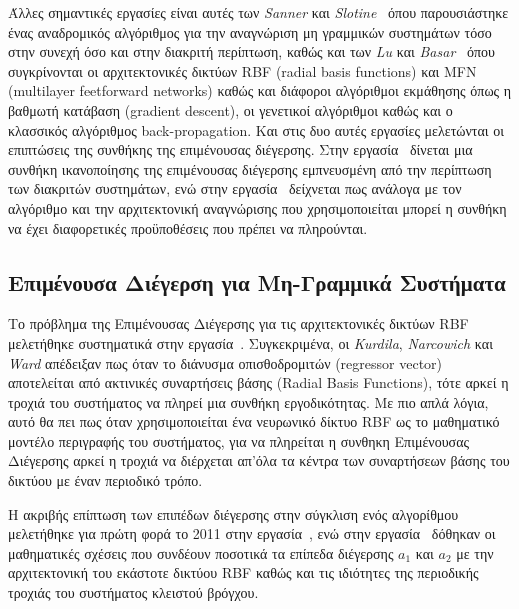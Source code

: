 Άλλες σημαντικές εργασίες είναι αυτές των \textit{Sanner} και \textit{Slotine}~\cite{sanner1992stable} όπου παρουσιάστηκε ένας αναδρομικός αλγόριθμος για την αναγνώριση μη γραμμικών συστημάτων τόσο στην συνεχή όσο και στην διακριτή περίπτωση, καθώς και των \textit{Lu} και \textit{Basar}~\cite{lu1998robust} όπου συγκρίνονται οι αρχιτεκτονικές δικτύων RBF (radial basis functions) και MFN (multilayer feetforward networks) καθώς και διάφοροι αλγόριθμοι εκμάθησης όπως η βαθμωτή κατάβαση (gradient descent), οι γενετικοί αλγόριθμοι καθώς και ο κλασσικός αλγόριθμος back-propagation. Και στις δυο αυτές εργασίες μελετώνται οι επιπτώσεις της συνθήκης της επιμένουσας διέγερσης. Στην εργασία~\cite{sanner1992stable} δίνεται μια συνθήκη ικανοποίησης της επιμένουσας διέγερσης εμπνευσμένη από την περίπτωση των διακριτών συστημάτων, ενώ στην εργασία~\cite{lu1998robust} δείχνεται πως ανάλογα με τον αλγόριθμο και την αρχιτεκτονική αναγνώρισης που χρησιμοποιείται μπορεί η συνθήκη να έχει διαφορετικές προϋποθέσεις που πρέπει να πληρούνται.

\subsection{Επιμένουσα Διέγερση για Μη-Γραμμικά Συστήματα}
Το πρόβλημα της Επιμένουσας Διέγερσης για τις αρχιτεκτονικές δικτύων RBF μελετήθηκε συστηματικά στην εργασία~\cite{kurdila1995persistency}. Συγκεκριμένα, οι \textit{Kurdila}, \textit{Narcowich} και \textit{Ward} απέδειξαν πως όταν το διάνυσμα οπισθοδρομιτών (regressor vector) αποτελείται από ακτινικές συναρτήσεις βάσης (Radial Basis Functions), τότε αρκεί η τροχιά του συστήματος να πληρεί μια συνθήκη εργοδικότητας. Με πιο απλά λόγια, αυτό θα πει πως όταν χρησιμοποιείται ένα νευρωνικό δίκτυο RBF ως το μαθηματικό μοντέλο περιγραφής του συστήματος, για να πληρείται η συνθηκη Επιμένουσας Διέγερσης αρκεί η τροχιά να διέρχεται απ'όλα τα κέντρα των συναρτήσεων βάσης του δικτύου με έναν περιοδικό τρόπο.

Η ακριβής επίπτωση των επιπέδων διέγερσης στην σύγκλιση ενός αλγορίθμου μελετήθηκε για πρώτη φορά το 2011 στην εργασία~\cite{yuan2011persistency}, ενώ στην εργασία~\cite{zheng2017relationship} δόθηκαν οι μαθηματικές σχέσεις που συνδέουν ποσοτικά τα επίπεδα διέγερσης $a_1$ και $a_2$ με την αρχιτεκτονική του εκάστοτε δικτύου RBF καθώς και τις ιδιότητες της περιοδικής τροχιάς του συστήματος κλειστού βρόγχου.

